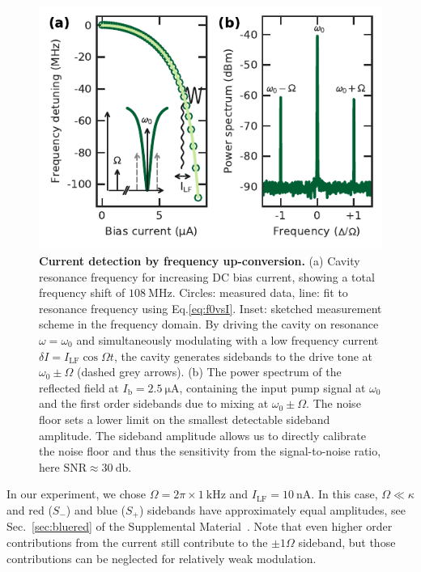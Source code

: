 \begin{figure}[t]
	\centering
	\includegraphics[width=.5\linewidth]{chapter-currentdetection/figures/Figure2}
	\caption{
		\textbf{Current detection by frequency up-conversion.}
		(a) Cavity resonance frequency for increasing DC bias current, showing a total frequency shift of $\SI{108}{\mega\hertz}$.
		Circles: measured data, line: fit to resonance frequency using Eq.\eqref{eq:f0vsI}.
		Inset: sketched measurement scheme in the frequency domain.
		By driving the cavity on resonance $\omega = \omega_0$ and simultaneously modulating with a low frequency current $\delta I = I_\text{LF}\cos\Omega t$, the cavity generates sidebands to the drive tone at $\omega_0 \pm \Omega$ (dashed grey arrows).
		(b) The power spectrum of the reflected field at $I_\text{b}=\SI{2.5}{\micro\ampere}$, containing the input pump signal at $\omega_0$ and the first order sidebands due to mixing at $\omega_0 \pm \Omega$.
		The noise floor sets a lower limit on the smallest detectable sideband amplitude.
		The sideband amplitude allows us to directly calibrate the noise floor and thus the sensitivity from the signal-to-noise ratio, here $\text{SNR}\approx\SI{30}{\decibel}$.
		\label{fig:figure2}
	}
\end{figure}


In our experiment, we chose $\Omega=2\pi\times\SI{1}{\kilo\hertz}$ and $I_\text{LF}=\SI{10}{\nano\ampere}$.
% 
In this case, $\Omega\ll\kappa$ and red ($S_{-}$) and blue ($S_{+}$) sidebands have approximately equal amplitudes, see Sec.~\ref{sec:bluered} of the Supplemental Material~\cite{SeeSupplementalMaterial}.
% 
Note that even higher order contributions from the current still contribute to the $\pm1\Omega$ sideband, but those contributions can be neglected for relatively weak modulation.




